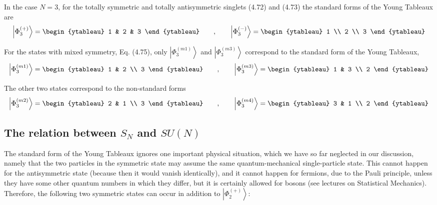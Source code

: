 \documentclass[10pt, letterpaper]{article}
\begin{document}
In the case $N=3$, for the totally symmetric and totally antisymmetric singlets (4.72) and (4.73) the standard forms of the Young Tableaux are
\[
\left| \Phi_3^{(+)} \right\rangle =
\begin{ytableau}
1 & 2 & 3
\end{ytableau}
\qquad , \qquad
\left| \Phi_3^{(-)} \right\rangle =
\begin{ytableau}
1 \\
2 \\
3
\end{ytableau}
\]


For the states with mixed symmetry, Eq. (4.75), only $\left|\Phi_{3}^{(m 1)}\right\rangle$ and $\left|\Phi_{3}^{(m 3)}\right\rangle$ correspond to the standard form of the Young Tableaux,
\[
\left| \Phi_3^{(m1)} \right\rangle =
\begin{ytableau}
1 & 2 \\
3
\end{ytableau}
\qquad , \qquad
\left| \Phi_3^{(m3)} \right\rangle =
\begin{ytableau}
1 & 3 \\
2
\end{ytableau}
\]


The other two states correspond to the non-standard forms
\[
\left| \Phi_3^{(m2)} \right\rangle =
\begin{ytableau}
2 & 1 \\
3
\end{ytableau}
\qquad , \qquad
\left| \Phi_3^{(m4)} \right\rangle =
\begin{ytableau}
3 & 1 \\
2
\end{ytableau}
\]


\subsection{The relation between $S_{N}$ and $S U(N)$}
The standard form of the Young Tableaux ignores one important physical situation, which we have so far neglected in our discussion, namely that the two particles in the symmetric state may assume the same quantum-mechanical single-particle state. This cannot happen for the antisymmetric state (because then it would vanish identically), and it cannot happen for fermions, due to the Pauli principle, unless they have some other quantum numbers in which they differ, but it is certainly allowed for bosons (see lectures on Statistical Mechanics). Therefore, the following two symmetric states can occur in addition to $\left|\Phi_{2}^{(+)}\right\rangle$:
\end{document}
